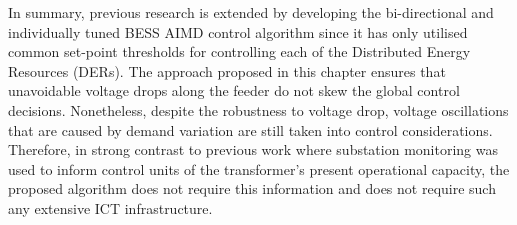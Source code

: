 In summary, previous research is extended by developing the bi-directional and individually tuned BESS AIMD control algorithm since it has only utilised common set-point thresholds for controlling each of the Distributed Energy Resources (DERs).
The approach proposed in this chapter ensures that unavoidable voltage drops along the feeder do not skew the global control decisions.
Nonetheless, despite the robustness to voltage drop, voltage oscillations that are caused by demand variation are still taken into control considerations.
Therefore, in strong contrast to previous work where substation monitoring was used to inform control units of the transformer's present operational capacity, the proposed algorithm does not require this information and does not require such any extensive ICT infrastructure.
